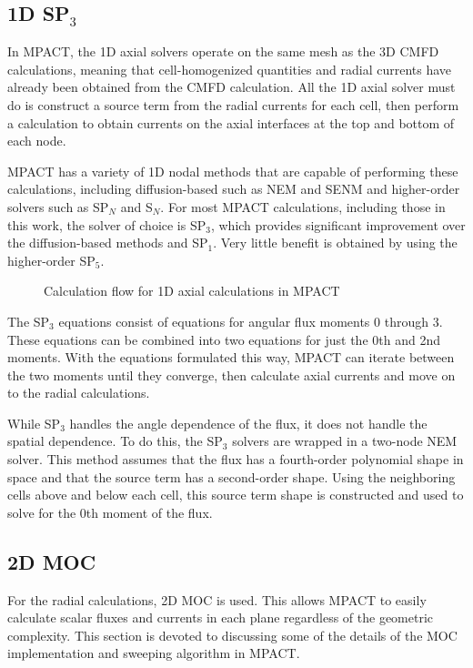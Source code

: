 \subsection{1D SP$_3$}

In MPACT, the 1D axial solvers operate on the same mesh as the 3D CMFD calculations, meaning that cell-homogenized quantities and radial currents have already been obtained from the CMFD calculation.  All the 1D axial solver must do is construct a source term from the radial currents for each cell, then perform a calculation to obtain currents on the axial interfaces at the top and bottom of each node.

MPACT has a variety of 1D nodal methods that are capable of performing these calculations, including diffusion-based such as NEM and SENM and higher-order solvers such as SP$_N$ and S$_N$.  For most MPACT calculations, including those in this work, the solver of choice is SP$_3$, which provides significant improvement over the diffusion-based methods and SP$_1$.  Very little benefit is obtained by using the higher-order SP$_5$.

\begin{figure}[h]
  \centering
  
  \caption{Calculation flow for 1D axial calculations in MPACT}\label{f:Axial-flowchart}
\end{figure}

The SP$_3$ equations consist of equations for angular flux moments 0 through 3.  These equations can be combined into two equations for just the 0th and 2nd moments.  With the equations formulated this way, MPACT can iterate between the two moments until they converge, then calculate axial currents and move on to the radial calculations.

While SP$_3$ handles the angle dependence of the flux, it does not handle the spatial dependence.  To do this, the SP$_3$ solvers are wrapped in a two-node NEM solver.  This method assumes that the flux has a fourth-order polynomial shape in space and that the source term has a second-order shape.  Using the neighboring cells above and below each cell, this source term shape is constructed and used to solve for the 0th moment of the flux.

\subsection{2D MOC}

For the radial calculations, 2D MOC is used.  This allows MPACT to easily calculate scalar fluxes and currents in each plane regardless of the geometric complexity.  This section is devoted to discussing some of the details of the MOC implementation and sweeping algorithm in MPACT.

